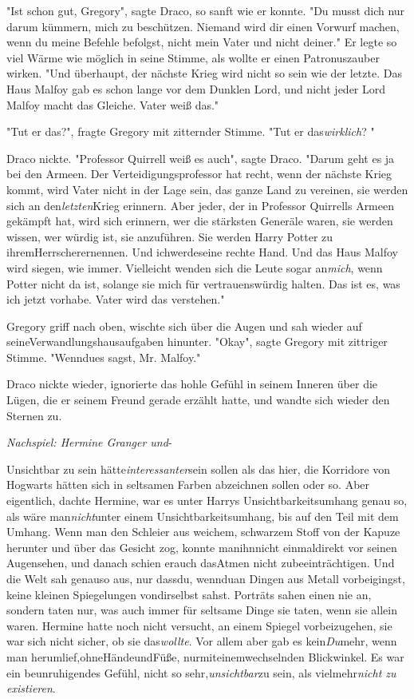 {"Ist schon gut, Gregory", sagte Draco, so sanft wie er konnte. "Du musst dich nur darum kümmern, mich zu beschützen. Niemand wird dir einen Vorwurf machen, wenn du meine Befehle befolgst, nicht mein Vater und nicht deiner." Er legte so viel Wärme wie möglich in seine Stimme, als wollte er einen Patronuszauber wirken. "Und überhaupt, der nächste Krieg wird nicht so sein wie der letzte. Das Haus Malfoy gab es schon lange vor dem Dunklen Lord, und nicht jeder Lord Malfoy macht das Gleiche. Vater weiß das."

"Tut er das?", fragte Gregory mit zitternder Stimme. "Tut er das\emph{wirklich}? "

Draco nickte. "Professor Quirrell weiß es auch", sagte Draco. "Darum geht es ja bei den Armeen. Der Verteidigungsprofessor hat recht, wenn der nächste Krieg kommt, wird Vater nicht in der Lage sein, das ganze Land zu vereinen, sie werden sich an den\emph{letzten}Krieg erinnern. Aber jeder, der in Professor Quirrells Armeen gekämpft hat, wird sich erinnern, wer die stärksten Generäle waren, sie werden wissen, wer würdig ist, sie anzuführen. Sie werden Harry Potter zu ihremHerrscherernennen. Und ichwerdeseine rechte Hand. Und das Haus Malfoy wird siegen, wie immer. Vielleicht wenden sich die Leute sogar an\emph{mich}, wenn Potter nicht da ist, solange sie mich für vertrauenswürdig halten. Das ist es, was ich jetzt vorhabe. Vater wird das verstehen."

Gregory griff nach oben, wischte sich über die Augen und sah wieder auf seineVerwandlungshausaufgaben hinunter. "Okay", sagte Gregory mit zittriger Stimme. "Wenndues sagst, Mr. Malfoy."

Draco nickte wieder, ignorierte das hohle Gefühl in seinem Inneren über die Lügen, die er seinem Freund gerade erzählt hatte, und wandte sich wieder den Sternen zu.

\emph{Nachspiel: Hermine Granger und}-

Unsichtbar zu sein hätte\emph{interessanter}sein sollen als das hier, die Korridore von Hogwarts hätten sich in seltsamen Farben abzeichnen sollen oder so. Aber eigentlich, dachte Hermine, war es unter Harrys Unsichtbarkeitsumhang genau so, als wäre man\emph{nicht}unter einem Unsichtbarkeitsumhang, bis auf den Teil mit dem Umhang. Wenn man den Schleier aus weichem, schwarzem Stoff von der Kapuze herunter und über das Gesicht zog, konnte manihnnicht einmaldirekt vor seinen Augensehen, und danach schien erauch dasAtmen nicht zubeeinträchtigen. Und die Welt sah genauso aus, nur dassdu, wennduan Dingen aus Metall vorbeigingst, keine kleinen Spiegelungen vondirselbst sahst. Porträts sahen einen nie an, sondern taten nur, was auch immer für seltsame Dinge sie taten, wenn sie allein waren. Hermine hatte noch nicht versucht, an einem Spiegel vorbeizugehen, sie war sich nicht sicher, ob sie das\emph{wollte}. Vor allem aber gab es kein\emph{Du}mehr, wenn man herumlief,ohneHändeundFüße, nurmiteinemwechselnden Blickwinkel. Es war ein beunruhigendes Gefühl, nicht so sehr,\emph{unsichtbar}zu sein, als vielmehr\emph{nicht zu existieren}.

}
